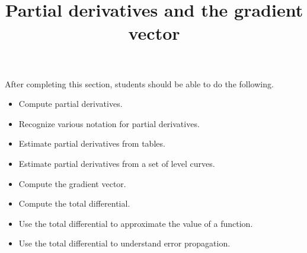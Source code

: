 \documentclass{ximera}
\title{Partial derivatives and the gradient vector}
\begin{document}
\begin{abstract}
\end{abstract}

\maketitle

\begin{sectionOutcomes}

After completing this section, students should be able to do the following.

\begin{itemize}
\item Compute partial derivatives.
\item Recognize various notation for partial derivatives.
\item Estimate partial derivatives from tables.
\item Estimate partial derivatives from a set of level curves.
\item Compute the gradient vector.
\item Compute the total differential.
\item Use the total differential to approximate the value of a function.
\item Use the total differential to understand error propagation.
\end{itemize}

\end{sectionOutcomes}
\end{document}
